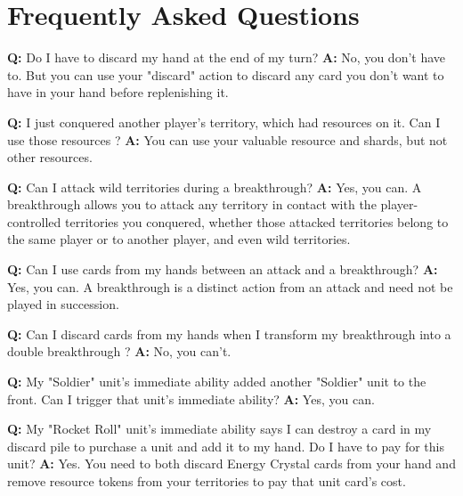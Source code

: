 \documentclass[a4paper]{article}
\begin{document}
\section{Frequently Asked Questions}

    \hspace{-2em}
    \textbf{Q:} Do I have to discard my hand at the end of my turn?
    \newline
    \textbf{A:} No, you don't have to. But you can use your "discard" action to discard
    any card you don't want to have in your hand before replenishing it.

    \hspace{-2em}
    \textbf{Q:} I just conquered another player's territory, which had resources on it.
    Can I use those resources ?
    \newline
    \textbf{A:} You can use your valuable resource and shards, but not other resources.

    \hspace{-2em}
    \textbf{Q:} Can I attack wild territories during a breakthrough?
    \newline
    \textbf{A:} Yes, you can. A breakthrough allows you to attack any territory in contact
    with the player-controlled territories you conquered, whether those attacked
    territories belong to the same player or to another player, and even wild territories.

    \hspace{-2em}
    \textbf{Q:} Can I use cards from my hands between an attack and a breakthrough?
    \newline
    \textbf{A:} Yes, you can. A breakthrough is a distinct action from an attack and
    need not be played in succession.

    \hspace{-2em}
    \textbf{Q:} Can I discard cards from my hands when I transform my breakthrough into
    a double breakthrough ?
    \newline
    \textbf{A:} No, you can't.

    \hspace{-2em}
    \textbf{Q:} My "Soldier" unit's immediate ability added another "Soldier"
    unit to the front. Can I trigger that unit's immediate ability?
    \newline
    \textbf{A:} Yes, you can.

    \hspace{-2em}
    \textbf{Q:} My "Rocket Roll" unit's immediate ability says I can destroy a card
    in my discard pile to purchase a unit and add it to my hand.
    Do I have to pay for this unit?
    \newline
    \textbf{A:} Yes. You need to both discard Energy Crystal cards from your hand
    and remove resource tokens from your territories to pay that unit card's cost.
    
\end{document}
